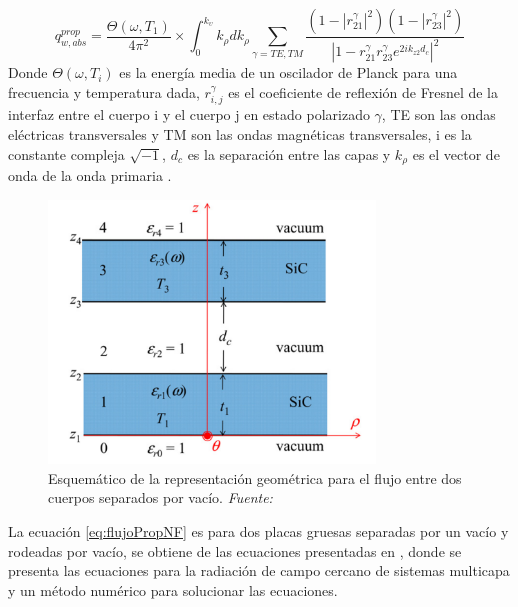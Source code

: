 \begin{equation}
q_{w,abs}^{prop}=\dfrac{\Theta \left( \omega,T_1 \right)}{4 \pi^2}\times \int^{k_\upsilon}_{0} k_\rho d k_\rho \sum_{\gamma=TE,TM}\dfrac{\left( 1- \left| r_{21}^\gamma \right|^2\right) \left( 1-  \left| r_{23}^\gamma \right|^2 \right)}{\left| 1- r_{21}^\gamma r_{23}^\gamma e^{2ik_{z2}d_{c}} \right|^2}
\label{eq:flujoPropNF}
\end{equation}
Donde $\Theta \left( \omega,T_i \right)$ es la energía media de un oscilador de Planck para una frecuencia y temperatura dada, $r_{i,j}^\gamma$ es el coeficiente de reflexión de Fresnel de la interfaz entre el cuerpo i y el cuerpo j en estado polarizado $\gamma$, TE son las ondas eléctricas transversales y TM son las ondas magnéticas transversales, i es la constante compleja $\sqrt{-1}$, $d_c$ es la separación entre las capas y $k_\rho$ es el vector de onda de la onda primaria \cite{nfTPV_fullEquations}.\\
\begin{figure}[H]
	\centering
		\includegraphics[height=7cm]{figuras/campoCercanoEquation1.png}
	\caption[Esquemático de la representación geométrica para el flujo entre dos cuerpos separados por vacío]{Esquemático de la representación geométrica para el flujo entre dos cuerpos separados por vacío. \textit{Fuente: \cite{nfTPV_equations}}}
	\label{fig:campoCercanoEquation1}
\end{figure}
La ecuación \ref{eq:flujoPropNF} es para dos placas gruesas separadas por un vacío y rodeadas por vacío, se obtiene de las ecuaciones presentadas en \cite{nfTPV_fullEquations}, donde se presenta las ecuaciones para la radiación de campo cercano de sistemas multicapa y un método numérico para solucionar las ecuaciones.

